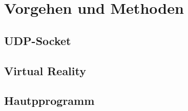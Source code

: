 \section{Vorgehen und Methoden}
\subsection{UDP-Socket}
\subsection{Virtual Reality}
\subsection{Hautpprogramm}

